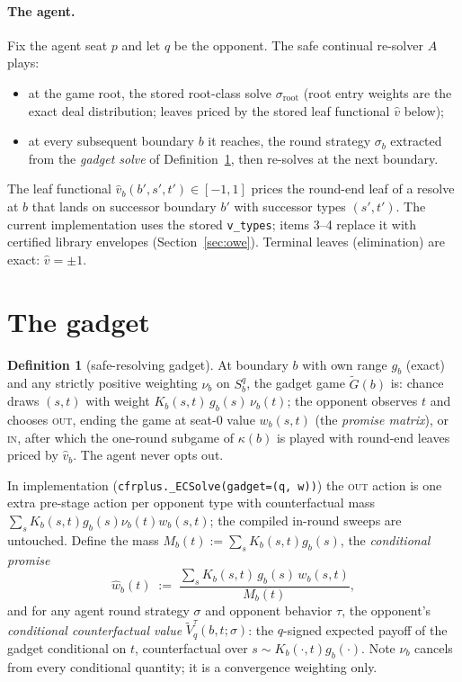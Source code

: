 \documentclass[11pt]{article}
\theoremstyle{plain}
\theoremstyle{definition}
\newtheorem{definition}[theorem]{Definition}
\theoremstyle{remark}
\begin{document}
\paragraph{The agent.} Fix the agent seat $p$ and let $q$ be the
opponent. The safe continual re-solver $A$ plays:
\begin{itemize}
\item at the game root, the stored root-class solve $\sigma_{\mathrm{root}}$
  (root entry weights are the exact deal distribution; leaves priced by
  the stored leaf functional $\hat v$ below);
\item at every subsequent boundary $b$ it reaches, the round strategy
  $\sigma_b$ extracted from the \emph{gadget solve} of
  Definition~\ref{def:gadget}, then re-solves at the next boundary.
\end{itemize}
The leaf functional $\hat v_b(b',s',t') \in [-1,1]$ prices the
round-end leaf of a resolve at $b$ that lands on successor boundary
$b'$ with successor types $(s',t')$. The current implementation uses
the stored \texttt{v\_types}; items 3--4 replace it with certified
library envelopes (Section~\ref{sec:owe}). Terminal leaves
(elimination) are exact: $\hat v = \pm 1$.

\section{The gadget}

\begin{definition}[safe-resolving gadget]\label{def:gadget}
At boundary $b$ with own range $g_b$ (exact) and any strictly positive
weighting $\nu_b$ on $S^q_b$, the gadget game $\tilde G(b)$ is: chance
draws $(s,t)$ with weight $K_b(s,t)\,g_b(s)\,\nu_b(t)$; the opponent
observes $t$ and chooses \textsc{out}, ending the game at seat-0 value
$w_b(s,t)$ (the \emph{promise matrix}), or \textsc{in}, after which
the one-round subgame of $\kappa(b)$ is played with round-end leaves
priced by $\hat v_b$. The agent never opts out.
\end{definition}

In implementation (\texttt{cfrplus.\_ECSolve(gadget=(q, w))}) the
\textsc{out} action is one extra pre-stage action per opponent type
with counterfactual mass $\sum_s K_b(s,t) g_b(s) \nu_b(t) w_b(s,t)$;
the compiled in-round sweeps are untouched. Define the mass
$M_b(t) := \sum_s K_b(s,t) g_b(s)$, the \emph{conditional promise}
\[
\hat w_b(t) \;:=\; \frac{\sum_s K_b(s,t)\, g_b(s)\, w_b(s,t)}{M_b(t)},
\]
and for any agent round strategy $\sigma$ and opponent behavior
$\tau$, the opponent's \emph{conditional counterfactual value}
$\tilde V^{\tau}_q(b,t;\sigma)$: the $q$-signed expected payoff of the
gadget conditional on $t$, counterfactual over $s \sim K_b(\cdot,t)
g_b(\cdot)$. Note $\nu_b$ cancels from every conditional quantity; it
is a convergence weighting only.
\end{document}
